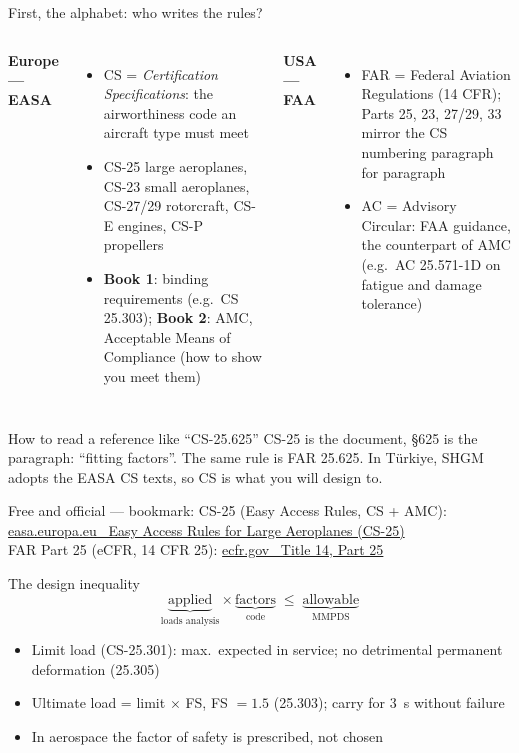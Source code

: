 \documentclass[aspectratio=169,10pt]{beamer}
\begin{document}
\begin{frame}{First, the alphabet: who writes the rules?}
\footnotesize
\begin{columns}[T]
\textbf{Europe --- EASA}
\begin{itemize}
  \item \alert{CS} = \emph{Certification Specifications}: the airworthiness code an aircraft type must meet
  \item CS-25 large aeroplanes, CS-23 small aeroplanes, CS-27/29 rotorcraft, CS-E engines, CS-P propellers
  \item \textbf{Book 1}: binding requirements (e.g.\ CS 25.303); \textbf{Book 2}: \alert{AMC}, Acceptable Means of Compliance (how to show you meet them)
\end{itemize}
\textbf{USA --- FAA}
\begin{itemize}
  \item \alert{FAR} = Federal Aviation Regulations (14 CFR); Parts 25, 23, 27/29, 33 mirror the CS numbering paragraph for paragraph
  \item \alert{AC} = Advisory Circular: FAA guidance, the counterpart of AMC (e.g.\ AC 25.571-1D on fatigue and damage tolerance)
\end{itemize}
\end{columns}
\vspace{4pt}
\begin{block}{How to read a reference like ``CS-25.625''}
CS-25 is the document, \S625 is the paragraph: ``fitting factors''. The same rule is FAR 25.625. In Türkiye, SHGM adopts the EASA CS texts, so CS is what you will design to.
\end{block}
\scriptsize Free and official --- bookmark: CS-25 (Easy Access Rules, CS + AMC): \href{https://www.easa.europa.eu/en/document-library/easy-access-rules/online-publications/easy-access-rules-large-aeroplanes-cs-25}{easa.europa.eu \textrightarrow\ Easy Access Rules for Large Aeroplanes (CS-25)}\\
FAR Part 25 (eCFR, 14 CFR 25): \href{https://www.ecfr.gov/current/title-14/chapter-I/subchapter-C/part-25}{ecfr.gov \textrightarrow\ Title 14, Part 25}
\end{frame}

\begin{frame}{The design inequality}
\begin{equation*}
  \underbrace{\text{applied}}_{\text{loads analysis}}\times\underbrace{\text{factors}}_{\text{code}}\;\le\;\underbrace{\text{allowable}}_{\text{MMPDS}}
\end{equation*}
\begin{itemize}
  \item \alert{Limit load} (CS-25.301): max.\ expected in service; no detrimental permanent deformation (25.305)
  \item \alert{Ultimate load} = limit $\times$ FS, FS $=1.5$ (25.303); carry for \SI{3}{s} without failure
  \item In aerospace the factor of safety is \alert{prescribed}, not chosen
\end{itemize}
\end{frame}
\end{document}
